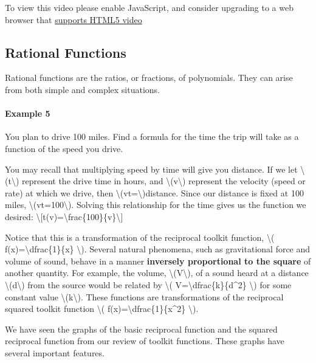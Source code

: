 To view this video please enable JavaScript, and consider upgrading to a
web browser that \href{http://videojs.com/html5-video-support/}{supports
HTML5 video}

\hypertarget{rational-functions}{%
\subsection{Rational Functions}\label{rational-functions}}

Rational functions are the ratios, or fractions, of polynomials. They
can arise from both simple and complex situations.

\hypertarget{example-5}{%
\paragraph{Example 5}\label{example-5}}

You plan to drive 100 miles. Find a formula for the time the trip will
take as a function of the speed you drive.

You may recall that multiplying speed by time will give you distance. If
we let \textbackslash{}(t\textbackslash{}) represent the drive time in
hours, and \textbackslash{}(v\textbackslash{}) represent the velocity
(speed or rate) at which we drive, then
\textbackslash{}(vt=\textbackslash{})distance. Since our distance is
fixed at 100 miles, \textbackslash{}(vt=100\textbackslash{}). Solving
this relationship for the time gives us the function we desired:
\textbackslash{}{[}t(v)=\textbackslash{}frac\{100\}\{v\}\textbackslash{}{]}

Notice that this is a transformation of the reciprocal toolkit function,
\textbackslash{}( f(x)=\textbackslash{}dfrac\{1\}\{x\}
\textbackslash{}). Several natural phenomena, such as gravitational
force and volume of sound, behave in a manner \textbf{inversely
proportional to the square} of another quantity. For example, the
volume, \textbackslash{}(V\textbackslash{}), of a sound heard at a
distance \textbackslash{}(d\textbackslash{}) from the source would be
related by \textbackslash{}( V=\textbackslash{}dfrac\{k\}\{d\^{}2\}
\textbackslash{}) for some constant value
\textbackslash{}(k\textbackslash{}). These functions are transformations
of the reciprocal squared toolkit function \textbackslash{}(
f(x)=\textbackslash{}dfrac\{1\}\{x\^{}2\} \textbackslash{}).

We have seen the graphs of the basic reciprocal function and the squared
reciprocal function from our review of toolkit functions. These graphs
have several important features.


